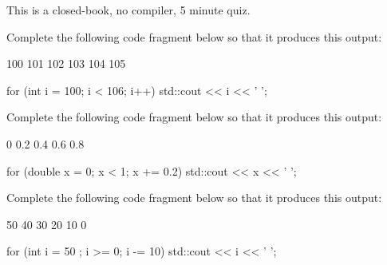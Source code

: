 

This is a closed-book, no compiler, 5 minute quiz.

\nextq
Complete the following code fragment below
so that it produces this output:
\begin{console}[fontsize=\small]
100 101 102 103 104 105
\end{console}
\ANSWER
\begin{answercode}
for (int i = 100; i < 106; i++)
{
    std::cout << i << ' ';
}
\end{answercode}

\nextq
Complete the following code fragment below
so that it produces this output:
\begin{console}[fontsize=\small]
0 0.2 0.4 0.6 0.8
\end{console}
\ANSWER
\begin{answercode}
for (double x = 0; x < 1; x += 0.2)
{
    std::cout << x << ' ';
}
\end{answercode}

\nextq
Complete the following code fragment below
so that it produces this output:
\begin{console}[fontsize=\small]
50 40 30 20 10 0
\end{console}
\ANSWER
\begin{answercode}
for (int i = 50 ; i >= 0; i -= 10)
{
    std::cout << i << ' ';
}
\end{answercode}



